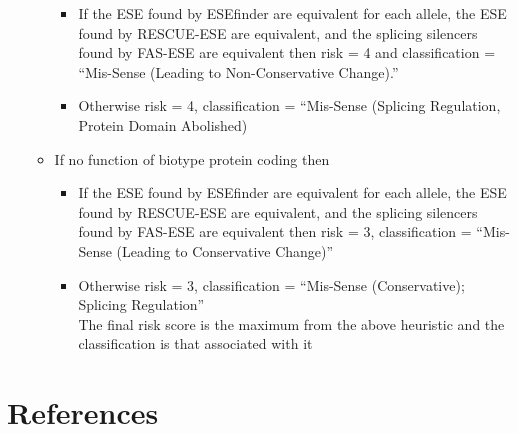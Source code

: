 \documentclass[11pt]{article}
\begin{document}
\begin{itemize}
\begin{itemize}
\begin{itemize}
\item If the ESE found by ESEfinder are equivalent for each allele, the ESE found by RESCUE-ESE are equivalent, and the splicing silencers found by FAS-ESE are equivalent then risk = 4 and classification = ``Mis-Sense (Leading to Non-Conservative Change).''\\
\label{sec-4-4-2-10-2-1}%
\item Otherwise risk = 4, classification = ``Mis-Sense (Splicing Regulation, Protein Domain Abolished)\\
\label{sec-4-4-2-10-2-2}%
\end{itemize} %

\item If no function of biotype protein coding then\\
\label{sec-4-4-2-10-3}%
\begin{itemize}

\item If the ESE found by ESEfinder are equivalent for each allele, the ESE found by RESCUE-ESE are equivalent, and the splicing silencers found by FAS-ESE are equivalent then risk = 3, classification = ``Mis-Sense (Leading to Conservative Change)''\\
\label{sec-4-4-2-10-3-1}%
\item Otherwise risk = 3, classification = ``Mis-Sense (Conservative); Splicing Regulation''\\
\label{sec-4-4-2-10-3-2}%
The final risk score is the maximum from the above heuristic and the
 classification is that associated with it



\end{itemize} %
\end{itemize} %
\end{itemize} %
\section{References}
\label{sec-5}
\end{document}
